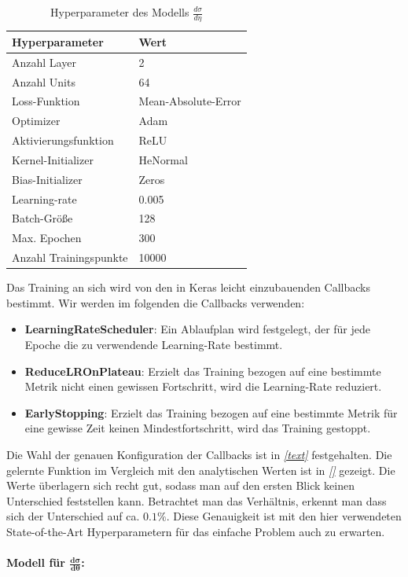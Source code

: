 \begin{table}[hbt]
	\centering
	\begin{tabular}{|l|l|}
		\hline
		Hyperparameter & Wert \\
		\hline
		Anzahl Layer & 2 \\
		Anzahl Units & 64 \\
		Loss-Funktion & Mean-Absolute-Error \\
		Optimizer & Adam \\
		Aktivierungsfunktion & ReLU \\
		Kernel-Initializer & HeNormal \\
		Bias-Initializer & Zeros \\
		Learning-rate & 0.005 \\
		Batch-Größe & 128 \\
		Max. Epochen & 300 \\
		Anzahl Trainingspunkte & 10000\\
		\hline
	\end{tabular}
	\caption{Hyperparameter des Modells $\frac{d\sigma}{d\eta}$}
\end{table}
Das Training an sich wird von den in Keras leicht einzubauenden Callbacks bestimmt. Wir werden im folgenden die Callbacks verwenden:
\begin{itemize}
	\item \textbf{LearningRateScheduler}: Ein Ablaufplan wird festgelegt, der für jede Epoche die zu verwendende Learning-Rate bestimmt. 
	\item \textbf{ReduceLROnPlateau}: Erzielt das Training bezogen auf eine bestimmte Metrik nicht einen gewissen Fortschritt, wird die Learning-Rate reduziert.
	\item \textbf{EarlyStopping}: Erzielt das Training bezogen auf eine bestimmte Metrik für eine gewisse Zeit keinen Mindestfortschritt, wird das Training gestoppt.
\end{itemize}
Die Wahl der genauen Konfiguration der Callbacks ist in \textit{\autoref{text}} festgehalten.
Die gelernte Funktion im Vergleich mit den analytischen Werten ist in \textit{\autoref{}} gezeigt. Die Werte überlagern sich recht gut, sodass man auf den ersten Blick keinen Unterschied feststellen kann. Betrachtet man das Verhältnis, erkennt man dass sich der Unterschied auf ca. $0.1\%$. Diese Genauigkeit ist mit den hier verwendeten State-of-the-Art Hyperparametern für das einfache Problem auch zu erwarten.
\\
\\
\textbf{Modell für $\mathbf{\frac{d\sigma}{d\theta}}$:}
